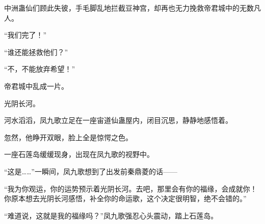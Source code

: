 \begin{this_body}
中洲蛊仙们顾此失彼，手毛脚乱地拦截豆神宫，却再也无力挽救帝君城中的无数凡人。

“我们完了！”

“谁还能拯救他们？”

“不，不能放弃希望！”

帝君城中乱成一片。

光阴长河。

河水滔滔，凤九歌立足在一座宙道仙蛊屋内，闭目沉思，静静地感悟着。

忽然，他睁开双眼，脸上全是惊愕之色。

一座石莲岛缓缓现身，出现在凤九歌的视野中。

“这是……”一瞬间，凤九歌想到了出发前秦鼎菱的话——

“我为你观运，你的运势预示着光阴长河。去吧，那里会有你的福缘，会成就你！你原本想去光阴长河感悟，补全你的命运歌，这个决定很明智，绝不会错的。”

“难道说，这就是我的福缘吗？”凤九歌强忍心头震动，踏上石莲岛。

\end{this_body}

